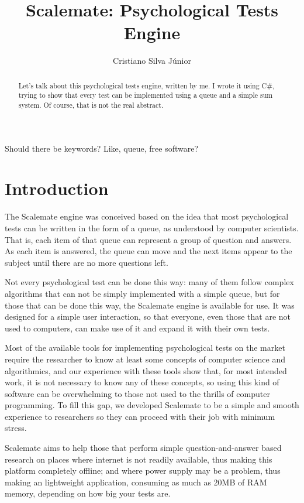 \documentclass[12pt, a4paper, twoside]{article}
\begin{document}
\title{Scalemate: Psychological Tests Engine}
\author{Cristiano Silva Júnior}
\date{}
\maketitle

\begin{abstract}
Let's talk about this psychological tests engine, written by me. I wrote it using C\#, trying to show that every test can be implemented using a queue and a simple sum system. Of course, that is not the real abstract.
\end{abstract}

Should there be keywords? Like, queue, free software?

\section{Introduction}

The Scalemate engine was conceived based on the idea that most psychological tests can be written in the form of a queue, as understood by computer scientists. That is, each item of that queue can represent a group of question and answers. As each item is answered, the queue can move and the next items appear to the subject until there are no more questions left.

Not every psychological test can be done this way: many of them follow complex algorithms that can not be simply implemented with a simple queue, but for those that can be done this way, the Scalemate engine is available for use. It was designed for a simple user interaction, so that everyone, even those that are not used to computers, can make use of it and expand it with their own tests.

Most of the available tools for implementing psychological tests on the market require the researcher to know at least some concepts of computer science and algorithmics, and our experience with these tools show that, for most intended work, it is not necessary to know any of these concepts, so using this kind of software can be overwhelming to those not used to the thrills of computer programming. To fill this gap, we developed Scalemate to be a simple and smooth experience to researchers so they can proceed with their job with minimum stress.

Scalemate aims to help those that perform simple question-and-answer based research on places where internet is not readily available, thus making this platform completely offline; and where power supply may be a problem, thus making an lightweight application, consuming as much as 20MB of RAM memory, depending on how big your tests are.
\end{document}
